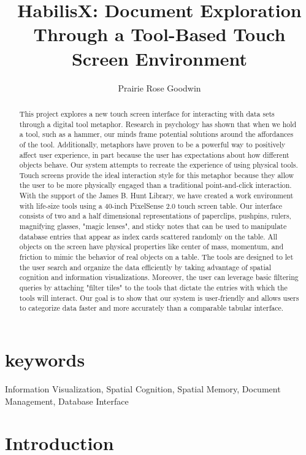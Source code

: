 \documentclass{article}
\begin{document}
\title{HabilisX: Document Exploration Through a Tool-Based Touch Screen Environment }
\author{Prairie Rose Goodwin}
\date{}
\maketitle
\begin{abstract}
This project explores a new touch screen interface for interacting with data sets through a digital tool metaphor.  Research in psychology has shown that when we hold a tool, such as a hammer, our minds frame potential solutions around the affordances of the tool.  Additionally, metaphors have proven to be a powerful way to positively affect user experience, in part because the user has expectations about how different objects behave.  Our system attempts to recreate the experience of using physical tools. Touch screens provide the ideal interaction style for this metaphor because they allow the user to be more physically engaged than a traditional point-and-click interaction. With the support of the James B. Hunt Library, we have created a work environment with life-size tools using a 40-inch PixelSense 2.0 touch screen table.  Our interface consists of two and a half dimensional representations of paperclips, pushpins, rulers, magnifying glasses, "magic lenses", and sticky notes that can be used to manipulate database entries that appear as index cards scattered randomly on the table.  All objects on the screen have physical properties like center of mass, momentum, and friction to mimic the behavior of real objects on a table.  The tools are designed to let the user search and organize the data efficiently by taking advantage of spatial cognition and information visualizations.  Moreover, the user can leverage basic filtering queries by attaching "filter tiles" to the tools that dictate the entries with which the tools will interact.  Our goal is to show that our system is user-friendly and allows users to categorize data faster and more accurately than a comparable tabular interface.
\end{abstract}
\section{keywords}
Information Visualization, Spatial Cognition, Spatial Memory, Document Management, Database Interface

\section{Introduction}	
\end{document}
